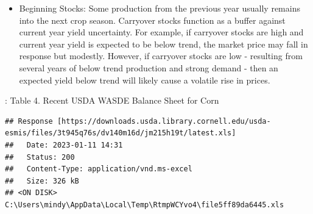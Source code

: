 \documentclass[
]{book}
\providecommand{\tightlist}{%
  \setlength{\itemsep}{0pt}\setlength{\parskip}{0pt}}
\begin{document}
\begin{itemize}
\tightlist
\item
  Beginning Stocks: Some production from the previous year usually remains into the next crop season. Carryover stocks function as a buffer against current year yield uncertainty. For example, if carryover stocks are high and current year yield is expected to be below trend, the market price may fall in response but modestly. However, if carryover stocks are low - resulting from several years of below trend production and strong demand - then an expected yield below trend will likely cause a volatile rise in prices.
\end{itemize}

: Table 4. Recent USDA WASDE Balance Sheet for Corn

\begin{verbatim}
## Response [https://downloads.usda.library.cornell.edu/usda-esmis/files/3t945q76s/dv140m16d/jm215h19t/latest.xls]
##   Date: 2023-01-11 14:31
##   Status: 200
##   Content-Type: application/vnd.ms-excel
##   Size: 326 kB
## <ON DISK>  C:\Users\mindy\AppData\Local\Temp\RtmpWCYvo4\file5ff89da6445.xls
\end{verbatim}
\end{document}
